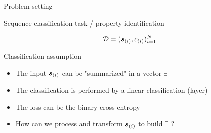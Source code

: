 \begin{frame}{Problem setting}
    \begin{block}{Sequence classification task / property identification}
    \begin{center}
      $$\mathcal{D}= (\boldsymbol{s}_{(i)} , {c}_{(i)} )_{i=1}^{N}$$ 
    \end{center}
  \end{block}
  \begin{block}{Classification assumption}
    \begin{itemize}
    \item The input $\boldsymbol{s}_{(i)}$ can be "summarized" in a vector $\exi$ 
    \item The classification is performed by a linear classification (layer)
    \item The loss can be the binary cross entropy 
    \item How can we process and transform $\boldsymbol{s}_{(i)}$ to build  $\exi$ ? 
    \end{itemize}
  \end{block}
\end{frame}


